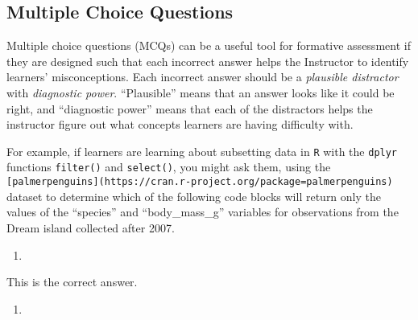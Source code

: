 \documentclass[
]{book}
\newenvironment{Shaded}{\begin{snugshade}}{\end{snugshade}}
\newcommand{\DecValTok}[1]{\textcolor[rgb]{0.00,0.00,0.81}{#1}}
\newcommand{\KeywordTok}[1]{\textcolor[rgb]{0.13,0.29,0.53}{\textbf{#1}}}
\newcommand{\NormalTok}[1]{#1}
\newcommand{\OperatorTok}[1]{\textcolor[rgb]{0.81,0.36,0.00}{\textbf{#1}}}
\newcommand{\StringTok}[1]{\textcolor[rgb]{0.31,0.60,0.02}{#1}}
\begin{document}
\hypertarget{multiple-choice-questions}{%
\subsection{Multiple Choice Questions}\label{multiple-choice-questions}}

Multiple choice questions (MCQs) can be a useful tool for formative assessment if they are
designed such that each incorrect answer helps the Instructor to identify learners'
misconceptions. Each incorrect answer should be a \emph{plausible distractor} with \emph{diagnostic power}.
``Plausible'' means that an answer looks like it could be right, and ``diagnostic power'' means
that each of the distractors helps the instructor figure out
what concepts learners are having difficulty with.

For example, if learners are learning about subsetting data in \texttt{R} with the \texttt{dplyr}
functions \texttt{filter()} and \texttt{select()}, you might ask them, using the \texttt{{[}palmerpenguins{]}(https://cran.r-project.org/package=palmerpenguins)} dataset to determine which of the
following code blocks will return only the values of the ``species'' and ``body\_mass\_g'' variables
for observations from the Dream island collected after 2007.

\begin{enumerate}
\def\labelenumi{\alph{enumi}.}
\item
\end{enumerate}

\begin{Shaded}
\end{Shaded}

This is the correct answer.

\begin{enumerate}
\def\labelenumi{\alph{enumi}.}
\setcounter{enumi}{1}
\item
\end{enumerate}

\begin{Shaded}
\end{Shaded}
\end{document}
